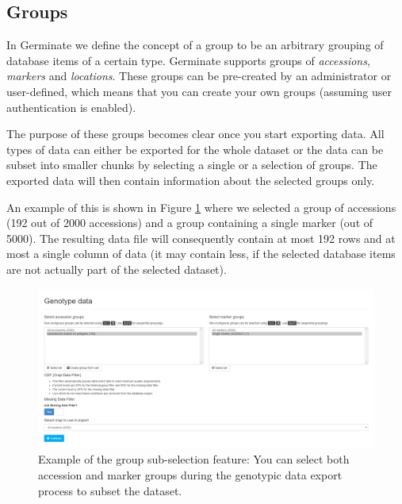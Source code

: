 \subsection{Groups}
In Germinate we define the concept of a group to be an arbitrary grouping of database items of a certain type. Germinate supports groups of \textit{accessions}, \textit{markers} and \textit{locations}. These groups can be pre-created by an administrator or user-defined, which means that you can create your own groups (assuming user authentication is enabled).

The purpose of these groups becomes clear once you start exporting data. All types of data can either be exported for the whole dataset or the data can be subset into smaller chunks by selecting a single or a selection of groups. The exported data will then contain information about the selected groups only.

An example of this is shown in Figure \ref{fig:features:group-subselection} where we selected a group of accessions (192 out of 2000 accessions) and a group containing a single marker (out of 5000). The resulting data file will consequently contain at most 192 rows and at most a single column of data (it may contain less, if the selected database items are not actually part of the selected dataset).

\begin{figure}
	\centering
	\includegraphics[width=0.85\linewidth]{img/features/group-subselection.png}
	\caption{Example of the group sub-selection feature: You can select both accession and marker groups during the genotypic data export process to subset the dataset.}
	\label{fig:features:group-subselection}
\end{figure}

